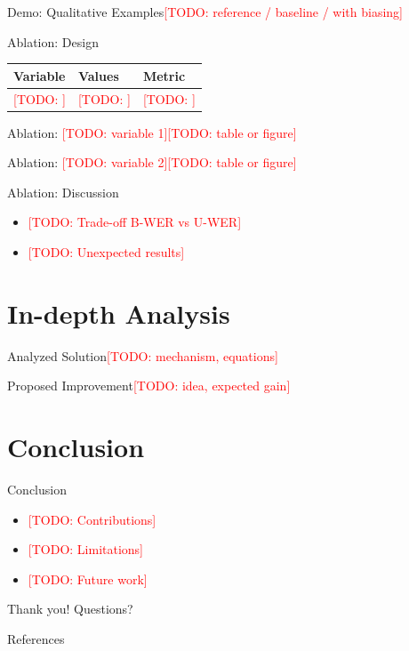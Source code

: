 \documentclass[aspectratio=169,11pt]{beamer}
\newcommand{\todo}[1]{\textcolor{red}{[TODO: #1]}}
\begin{document}
\begin{frame}{Demo: Qualitative Examples}\todo{reference / baseline / with biasing}\end{frame}

\begin{frame}{Ablation: Design}
  \small
  \begin{tabularx}{\textwidth}{@{}l X X@{}}
    \toprule
    \textbf{Variable} & \textbf{Values} & \textbf{Metric} \\
    \midrule
    \todo{} & \todo{} & \todo{} \\
    \bottomrule
  \end{tabularx}
\end{frame}

\begin{frame}{Ablation: \todo{variable 1}}\todo{table or figure}\end{frame}
\begin{frame}{Ablation: \todo{variable 2}}\todo{table or figure}\end{frame}
\begin{frame}{Ablation: Discussion}
  \begin{itemize}
    \item \todo{Trade-off B-WER vs U-WER}
    \item \todo{Unexpected results}
  \end{itemize}
\end{frame}

\section{In-depth Analysis}
\begin{frame}{Analyzed Solution}\todo{mechanism, equations}\end{frame}
\begin{frame}{Proposed Improvement}\todo{idea, expected gain}\end{frame}

\section{Conclusion}
\begin{frame}{Conclusion}
  \begin{itemize}
    \item \todo{Contributions}
    \item \todo{Limitations}
    \item \todo{Future work}
  \end{itemize}
\end{frame}

\begin{frame}[standout]Thank you! Questions?\end{frame}

\appendix
\begin{frame}[allowframebreaks]{References}
  \footnotesize\nocite{*}
  
  
\end{frame}
\end{document}
